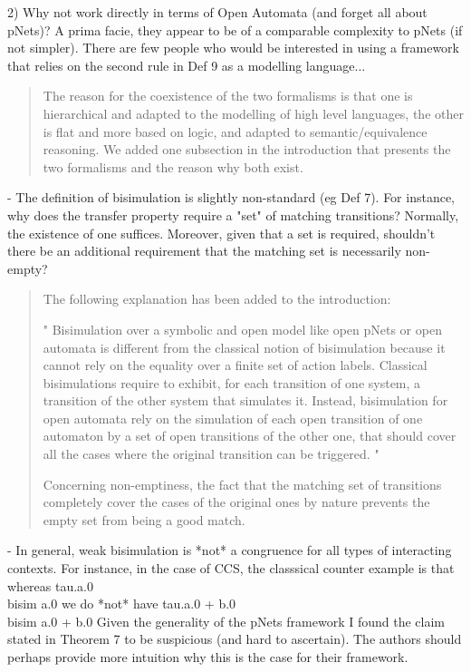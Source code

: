 \documentclass{article}
\begin{document}
2) Why not work directly in terms of Open Automata (and forget all about pNets)?  A prima facie, they appear to be of a comparable complexity to pNets (if not simpler).  There are few people who would be interested in using a framework that relies on the second rule in Def 9 as a modelling language...  
\begin{quote}
The reason for the coexistence of the two formalisms is that one is hierarchical and adapted to the modelling of high level languages, the other is flat and more based on logic, and adapted to semantic/equivalence reasoning.
We added one subsection in the introduction that presents the two formalisms and the reason why both exist.
\end{quote}

- The definition of bisimulation is slightly non-standard (eg Def 7).  For instance, why does the transfer property require a "set" of matching transitions?  Normally, the existence of one suffices.  Moreover, given that a set is required, shouldn't there be an additional requirement that the matching set is necessarily non-empty? 

\begin{quote}
The following explanation has been added to the introduction:

" Bisimulation over a symbolic and open model like open pNets or open automata is  different from the classical notion of bisimulation because it cannot rely on the equality over a finite set of action labels. Classical bisimulations require to exhibit, for each transition of one system, a transition of the other system that simulates it. Instead, bisimulation for open automata  rely on the simulation of each open transition of one automaton by a set of open transitions of the other one, that should cover all the 
cases where the original transition can be triggered.
"

Concerning non-emptiness, the fact that the matching set of transitions completely cover the cases of the original ones by nature prevents the empty set from being a good match. 
\end{quote}

- In general, weak bisimulation is *not* a congruence for all types of interacting contexts.  For instance, in the case of CCS, the classsical counter example is that whereas 
tau.a.0  \\bisim  a.0
we do *not* have
tau.a.0 + b.0 \\bisim  a.0 + b.0 
Given the generality of the pNets framework I found the claim stated in Theorem 7 to be suspicious (and hard to ascertain).  The authors should perhaps provide more intuition why this is the case for their framework.
\end{document}
